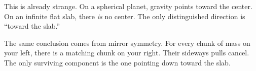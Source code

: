 \documentclass[11pt, letterpaper]{article}
\begin{document}
\begin{center}
\end{center}

This is already strange. On a spherical planet, gravity points toward the center. On an infinite flat slab, there \textit{is} no center. The only distinguished direction is ``toward the slab.''

The same conclusion comes from mirror symmetry. For every chunk of mass on your left, there is a matching chunk on your right. Their sideways pulls cancel. The only surviving component is the one pointing down toward the slab.

\end{document}
